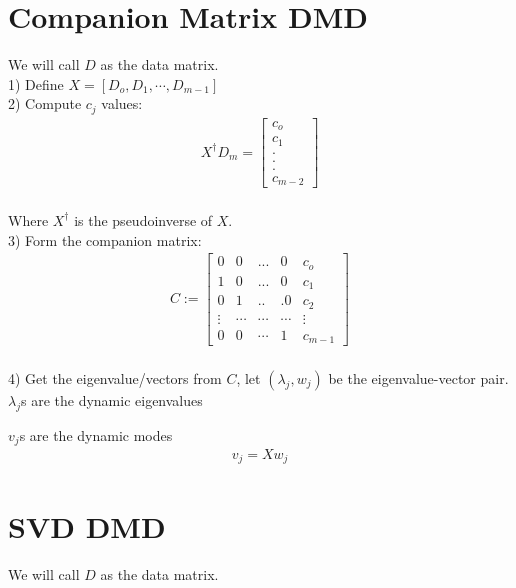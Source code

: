 \documentclass{article}
\begin{document}
\newpage
\section{Companion Matrix DMD\autocite[8]{YoshiComp}}
We will call $D$ as the data matrix.\\

1) Define $X=[D_o,D_1, \cdots ,D_{m-1}]$\\

2) Compute $c_j$ values:\\
\begin{align*}
X^\dagger D_m = \begin{bmatrix}
c_o \\
c_1 \\
.\\
.\\
.\\
c_{m-2}
\end{bmatrix}
\end{align*}\\
Where $X^\dagger$ is the pseudoinverse of $X$.\\

3) Form the companion matrix:
\begin{align*}
C:= \begin{bmatrix}
0 & 0 &...& 0 &c_o \\
1 &0& ...&  0& c_1 \\
0 &1& ..&. 0& c_2 \\
\vdots& \cdots& \cdots& \cdots & \vdots \\
0 &0& \cdots& 1& c_{m-1}
\end{bmatrix}
\end{align*}\\

4) Get the eigenvalue/vectors from $C$, let $(\lambda_j,w_j)$ be the eigenvalue-vector pair.\\

$\lambda_j$s are the dynamic eigenvalues\

$v_j$s are the dynamic modes\\
\begin{align*}
v_j=Xw_j
\end{align*}

\section{SVD DMD\autocite[9]{tu2013dynamic}}
We will call $D$ as the data matrix.\\
\end{document}

